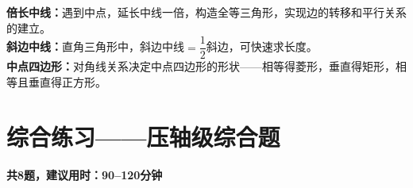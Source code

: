 \documentclass[12pt, a4paper]{ctexart}
\begin{document}
\begin{tipbox}
\textbf{倍长中线：}遇到中点，延长中线一倍，构造全等三角形，实现边的转移和平行关系的建立。\\
\textbf{斜边中线：}直角三角形中，斜边中线$= \dfrac{1}{2}$斜边，可快速求长度。\\
\textbf{中点四边形：}对角线关系决定中点四边形的形状——相等得菱形，垂直得矩形，相等且垂直得正方形。
\end{tipbox}

\newpage
\section*{\textcolor{apppurple}{综合练习——压轴级综合题}}

\begin{center}
\textbf{\large 共8题，建议用时：90--120分钟}
\end{center}
\end{document}
